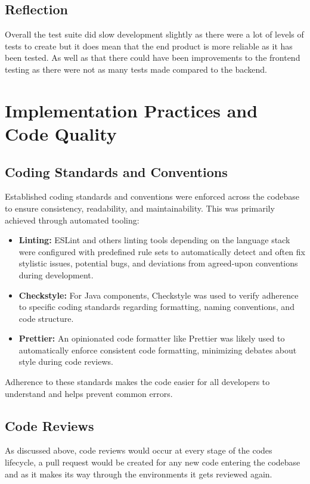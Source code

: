 \documentclass[]{project_report}
\begin{document}
\subsection{Reflection}
Overall the test suite did slow development slightly as there were a lot of levels of tests to create but it does mean that the end product is more reliable as it has been tested. As well as that there could have been improvements to the frontend testing as there were not as many tests made compared to the backend.

\section{Implementation Practices and Code Quality}
\subsection{Coding Standards and Conventions}
Established coding standards and conventions were enforced across the codebase to ensure consistency, readability, and maintainability. This was primarily achieved through automated tooling:

\begin{itemize}
    \item \textbf{Linting:} ESLint and others linting tools depending on the language stack were configured with predefined rule sets to automatically detect and often fix stylistic issues, potential bugs, and deviations from agreed-upon conventions during development.
    \item \textbf{Checkstyle:} For Java components, Checkstyle was used to verify adherence to specific coding standards regarding formatting, naming conventions, and code structure.
    \item \textbf{Prettier:} An opinionated code formatter like Prettier was likely used to automatically enforce consistent code formatting, minimizing debates about style during code reviews.
\end{itemize}

Adherence to these standards makes the code easier for all developers to understand and helps prevent common errors.


\subsection{Code Reviews}
As discussed above, code reviews would occur at every stage of the codes lifecycle, a pull request would be created for any new code entering the codebase and as it makes its way through the environments it gets reviewed again.
\end{document}
